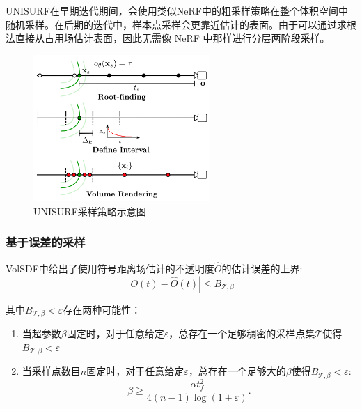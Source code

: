 UNISURF\cite{oechsle_unisurf_2021}在早期迭代期间，会使用类似NeRF中的粗采样策略在整个体积空间中随机采样。在后期的迭代中，样本点采样会更靠近估计的表面。由于可以通过求根法\cite{niemeyer_differentiable_2020}直接从占用场估计表面，因此无需像 NeRF 中那样进行分层两阶段采样。

\begin{figure}[ht]
    \centering
    \includegraphics[width=0.6\textwidth]{undergraduate-thesis/images/related-work/unisurf-sampling.png}
    \caption{UNISURF\cite{oechsle_unisurf_2021}采样策略示意图}
    \label{fig:related-work unisurf-sampling}
\end{figure}

\subsubsection{基于误差的采样}
VolSDF\cite{yariv_volume_2021}中给出了使用符号距离场估计的不透明度$\hat{O}$的估计误差的上界:
\begin{equation}
    |O(t)-\hat{O}(t)|\leq B_{\mathcal{T},\beta}
\end{equation}

其中$B_{\mathcal{T},\beta}<\varepsilon$存在两种可能性：
\begin{enumerate}
    \item 当超参数$\beta$固定时，对于任意给定$\varepsilon$，总存在一个足够稠密的采样点集$\mathcal{T}$使得$B_{\mathcal{T},\beta}<\varepsilon$
    \item 当采样点数目$n$固定时，对于任意给定$\varepsilon$，总存在一个足够大的$\beta$使得$B_{\mathcal{T},\beta}<\varepsilon$:
    \begin{equation}
        \beta\geq\frac{\alpha t_f^2}{4(n-1)\log(1+\varepsilon)}.
        \label{eq: related-work volsdf beta-error}
    \end{equation}
\end{enumerate}

